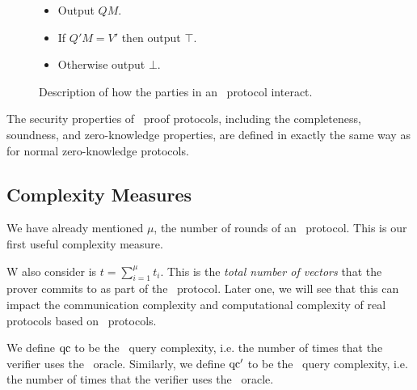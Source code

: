 \begin{figure}[!h]
{\begin{minipage}[t]{6.5cm}
\begin{algorithm}[H]
\caption*{\ILCopen($Q$)}
\begin{itemize}
\item Output $QM$.
\end{itemize}
\end{algorithm}
\begin{algorithm}[H]
\caption*{\ILCcheck($Q', V'$)}
\begin{itemize}
\item If $Q'M = V'$ then output $\top$.
\item Otherwise output $\bot$.
\end{itemize}
\end{algorithm}
\end{minipage}
}
\caption{Description of how the parties in an \ILC\ protocol interact.}
\label{fig:ILCpseudocode}
\end{figure}

The security properties of \ILC\ proof protocols, including the completeness, soundness, and zero-knowledge properties, are defined in exactly the same way as for normal zero-knowledge protocols.

\subsection{Complexity Measures}

We have already mentioned $\mu$, the number of rounds of an \ILC\ protocol. This is our first useful complexity measure.

W also consider is $t = \sum_{i=1}^\mu t_i$. This is the \emph{total number of vectors} that the prover commits to as part of the \ILC\ protocol. Later one, we will see that this can impact the communication complexity and computational complexity of real protocols based on \ILC\ protocols.

We define $\mathrm{qc}$ to be the \ILCopen\ query complexity, i.e. the number of times that the verifier uses the \ILCopen\ oracle. Similarly, we define $\mathrm{qc}'$ to be the \ILCcheck\ query complexity, i.e. the number of times that the verifier uses the \ILCcheck\ oracle. 


